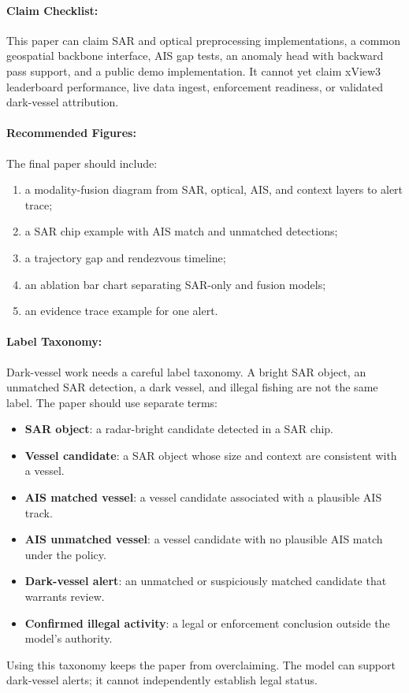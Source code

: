 \documentclass{article}
\begin{document}
\paragraph{Claim Checklist:}

This paper can claim SAR and optical preprocessing implementations, a common geospatial backbone interface, AIS gap tests, an anomaly head with backward pass support, and a public demo implementation. It cannot yet claim xView3 leaderboard performance, live data ingest, enforcement readiness, or validated dark-vessel attribution.

\paragraph{Recommended Figures:}

The final paper should include:
\begin{enumerate}
  \item a modality-fusion diagram from SAR, optical, AIS, and context layers to alert trace;
  \item a SAR chip example with AIS match and unmatched detections;
  \item a trajectory gap and rendezvous timeline;
  \item an ablation bar chart separating SAR-only and fusion models;
  \item an evidence trace example for one alert.
\end{enumerate}

\paragraph{Label Taxonomy:}

Dark-vessel work needs a careful label taxonomy. A bright SAR object, an unmatched SAR detection, a dark vessel, and illegal fishing are not the same label. The paper should use separate terms:
\begin{itemize}
  \item \textbf{SAR object}: a radar-bright candidate detected in a SAR chip.
  \item \textbf{Vessel candidate}: a SAR object whose size and context are consistent with a vessel.
  \item \textbf{AIS matched vessel}: a vessel candidate associated with a plausible AIS track.
  \item \textbf{AIS unmatched vessel}: a vessel candidate with no plausible AIS match under the policy.
  \item \textbf{Dark-vessel alert}: an unmatched or suspiciously matched candidate that warrants review.
  \item \textbf{Confirmed illegal activity}: a legal or enforcement conclusion outside the model's authority.
\end{itemize}
Using this taxonomy keeps the paper from overclaiming. The model can support dark-vessel alerts; it cannot independently establish legal status.
\end{document}
